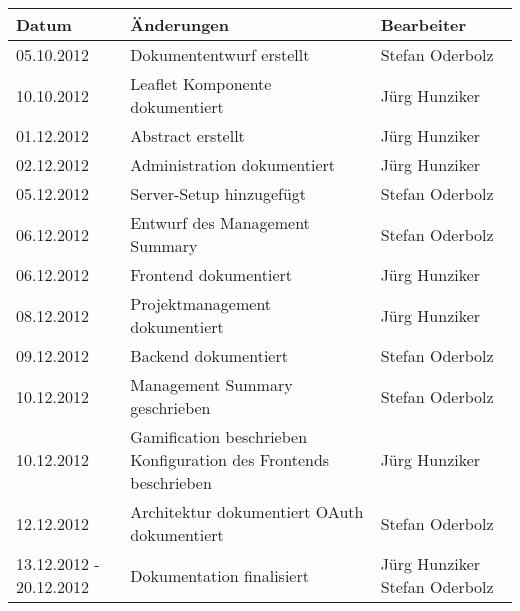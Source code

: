 \begin{longtable}{|p{0.15\threecelltabwidth}|p{0.65\threecelltabwidth}|p{0.2\threecelltabwidth}|}
\hline 
\textbf{Datum} & \textbf{Änderungen} & \textbf{Bearbeiter} \\ 
\hline 
05.10.2012 & Dokumententwurf erstellt & Stefan Oderbolz \\ 
\hline 
10.10.2012 & Leaflet Komponente dokumentiert & Jürg Hunziker \\ 
\hline 
01.12.2012 & Abstract erstellt & Jürg Hunziker \\ 
\hline 
02.12.2012 & Administration dokumentiert & Jürg Hunziker \\ 
\hline
05.12.2012 & Server-Setup hinzugefügt & Stefan Oderbolz \\ 
\hline 
06.12.2012 & Entwurf des Management Summary & Stefan Oderbolz \\ 
\hline 
06.12.2012 & Frontend dokumentiert & Jürg Hunziker \\ 
\hline 
08.12.2012 & Projektmanagement dokumentiert & Jürg Hunziker \\ 
\hline 
09.12.2012 & Backend dokumentiert & Stefan Oderbolz \\ 
\hline 
10.12.2012 & Management Summary geschrieben & Stefan Oderbolz \\ 
\hline 
10.12.2012 & Gamification beschrieben \newline Konfiguration des Frontends beschrieben & Jürg Hunziker \\ 
\hline 
12.12.2012 & Architektur dokumentiert \newline OAuth dokumentiert & Stefan Oderbolz \\ 
\hline 
13.12.2012 - 20.12.2012 & Dokumentation finalisiert & Jürg Hunziker \newline Stefan Oderbolz \\ 
\hline 
\end{longtable} 